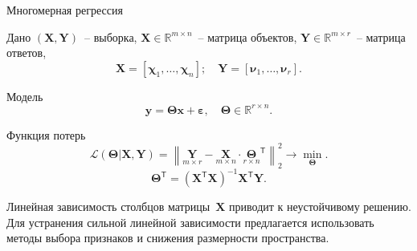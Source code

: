\documentclass[9pt]{beamer}
\newcommand{\bx}{\mathbf{x}}
\newcommand{\by}{\mathbf{y}}
\newcommand{\bY}{\mathbf{Y}}
\newcommand{\bX}{\mathbf{X}}
\newcommand{\bbR}{\mathbb{R}}
\newcommand{\bchi}{\boldsymbol{\chi}}
\newcommand{\bnu}{\boldsymbol{\nu}}
\newcommand{\bTheta}{\boldsymbol{\Theta}}
\newcommand{\T}{\mathsf{T}}
\begin{document}
\begin{frame}{Многомерная регрессия}
	\begin{block}{Дано}
	$\left( \bX, \bY \right)$~-- выборка, $\bX \in \bbR^{m \times n}$~-- матрица объектов, $\bY \in \bbR^{m \times r}$~-- матрица ответов,
	\[
	\bX = [\bchi_1, \dots, \bchi_n]; \quad \bY =  [\bnu_1, \dots, \bnu_r].
	\]
	\vspace{-0.7cm}
	\end{block}

\begin{block}{Модель}
	\vspace{-0.3cm}
	\[
		\by = \bTheta \bx+ \boldsymbol{\varepsilon}, \quad \bTheta \in \bbR^{r \times n}.
	\]
	\vspace{-0.5cm}
\end{block}
	\begin{block}{Функция потерь}
	\[
	\mathcal{L}(\bTheta | \bX, \bY) = {\left\| \underset{m \times r}{\mathbf{Y}}  - \underset{m \times n}{\bX} \cdot \underset{r \times n}{\bTheta}^{\T} \right\| }_2^2 \rightarrow\min_{\bTheta}.
	\label{eq:error_function}
	\]
	\[
	\bTheta^{\T} = (\bX^{\T} \bX)^{-1} \bX^{\T} \bY.
	\]
	\end{block}
	Линейная зависимость столбцов матрицы~$\bX$ приводит к неустойчивому решению. \\
	Для устранения сильной линейной зависимости предлагается использовать методы выбора признаков и снижения размерности пространства. 
\end{frame}
\end{document}
